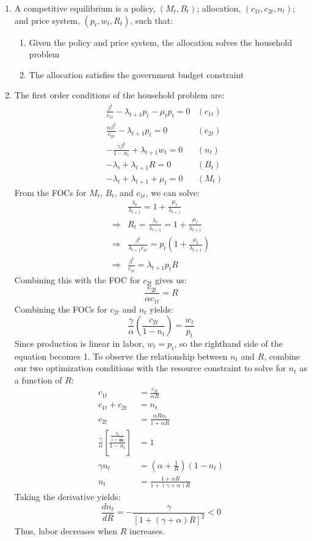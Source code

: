 \documentclass{article}
\begin{document}
\begin{enumerate}
	\item A competitive equilibrium is a policy, $(M_t,B_t)$; allocation, ${(c_{1t},c_{2t},n_t)}$; and price system, ${(p_t,w_t,R_t)}$, such that:
		\begin{enumerate}
			\item Given the policy and price system, the allocation solves the household problem
			\item The allocation satisfies the government budget constraint
		\end{enumerate}
	
	\item The first order conditions of the household problem are:
		\begin{align*}
			&\frac{\beta^t}{c_{1t}} - \lambda_{t+1}p_t - \mu_tp_t = 0	&(c_{1t})	\\
			&\frac{\alpha\beta^t}{c_{2t}} - \lambda_{t+1}p_t = 0		&(c_{2t})	\\
			&-\frac{\gamma\beta^t}{1-n_t} + \lambda_{t+1}w_t = 0		&(n_{t})	\\
			&-\lambda_t + \lambda_{t+1}R = 0							&(B_t)		\\
			&-\lambda_t + \lambda_{t+1} + \mu_t = 0						&(M_t)		
		\end{align*}
		From the FOCs for $M_t$, $B_t$, and $c_{1t}$, we can solve:
		\begin{align*}
			&\frac{\lambda_t}{\lambda_{t+1}}	= 1 + \frac{\mu_t}{\lambda_{t+1}}									\\
			\Rightarrow &R_t = \frac{\lambda_t}{\lambda_{t+1}} = 1 + \frac{\mu_t}{\lambda_{t+1}}					\\
			\Rightarrow &\frac{\beta^t}{\lambda_{t+1}c_{1t}} =  p_t\left(1 + \frac{\mu_t}{\lambda_{t+1}}\right) 	\\
			\Rightarrow &\frac{\beta^t}{c_{1t}} = \lambda_{t+1}p_tR
		\end{align*}
		Combining this with the FOC for $c_{2t}$ gives us: $$ \frac{c_{2t}}{\alpha c_{1t}} = R $$ Combining the FOCs for $c_{2t}$ and $n_t$ yields: $$ \frac{\gamma}{\alpha}\left(\frac{c_{2t}}{1-n_t}\right) = \frac{w_t}{p_t} $$ Since production is linear in labor, ${w_t=p_t}$, so the righthand side of the equation becomes 1. To observe the relationship between $n_t$ and $R$, combine our two optimization conditions with the resource constraint to solve for $n_t$ as a function of $R$:
		\begin{align*}
			c_{1t}			&= \frac{c_{2t}}{\alpha R}													\\
			c_{1t} + c_{2t} &= n_t																		\\
			c_{2t}			&= \frac{\alpha Rn_t}{1 + \alpha R}											\\
			\frac{\gamma}{\alpha}\left[\frac{\frac{n_t}{1 + \frac{1}{\alpha R}}}{1-n_t}\right] &= 1		\\
			\gamma n_t &= \left(\alpha + \frac{1}{R}\right)(1-n_t)										\\
			n_t &= \frac{1 + \alpha R}{1 + (\gamma + \alpha)R}
		\end{align*}
		Taking the derivative yields:
		\[
			\frac{dn_t}{dR} = -\frac{\gamma}{\left[1 + (\gamma + \alpha)R\right]^2} < 0
		\]
		Thus, labor decreases when $R$ increases.
	
\end{enumerate}


\end{document}
